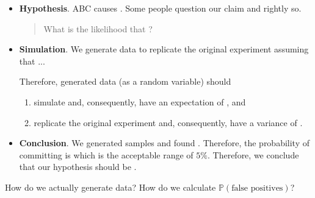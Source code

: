 \documentclass[../main.tex]{subfiles}
\begin{document}
\begin{example}
\begin{itemize}[wide]
    \item \textbf{Hypothesis}. ABC causes \underline{\hspace{2in}}.  Some people question our claim and rightly so.

      \begin{quote}
        \faQuestion{} What is the likelihood that \underline{\hspace{3in}}?
      \end{quote}

    \item \textbf{Simulation}.  We generate data to replicate the original experiment assuming that ...

      Therefore, generated data (as a random variable) should 
      \begin{enumerate}
        \item simulate \underline{\hspace{2in}} and, consequently, have an expectation of \underline{\hspace{1cm}}, and
        \item replicate the original experiment and, consequently, have a variance of \underline{\hspace{1cm}}.  
      \end{enumerate}



    \item \textbf{Conclusion}. We generated \underline{\hspace{1.5cm}} samples and found \underline{\hspace{2cm}} \underline{\hspace{2in}}. Therefore, the probability of committing \underline{\hspace{2in}} is \underline{\hspace{1cm}} which is \underline{\hspace{1in}} the acceptable range of \(5\%\). Therefore, we conclude that our hypothesis should be \underline{\hspace{1in}}. 
  \end{itemize}
  \clearpage
  
  How do we actually generate data? How do we calculate \(\mathbb{P}(\text{false positives})\)?


\end{example}
\end{document}
